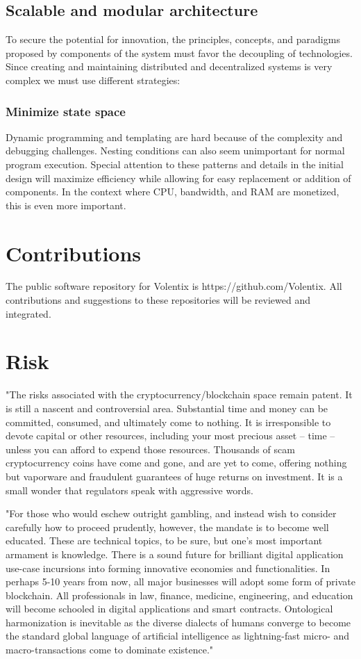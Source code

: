 \documentclass[]{article}
\begin{document}
{\subsection{Scalable and modular architecture}
To secure the potential for innovation, the principles, 
concepts, and paradigms proposed by components of the system must favor the decoupling of technologies. 
Since creating and maintaining distributed and decentralized systems
is very complex we must use different strategies: 
\subsubsection{Minimize state space}
Dynamic programming and templating are hard because of the complexity and debugging challenges. 
Nesting conditions can also seem unimportant for normal program execution.
Special attention to these patterns and details in the initial design will maximize efficiency while allowing for easy replacement or addition of components.   
In the context where CPU, bandwidth, and RAM are monetized, this is even more important. 

\section{Contributions}
The public software repository for Volentix is https://github.com/Volentix.
All contributions and suggestions to these repositories will be reviewed and integrated. 

\section{Risk}
"The risks associated with the cryptocurrency/blockchain space remain patent. It is still a nascent and controversial area. Substantial time and money can be committed, consumed, and ultimately come to nothing. It is irresponsible to devote capital or other resources, including your most precious asset -- time -- unless you can afford to expend those resources. Thousands of scam cryptocurrency coins have come and gone, and are yet to come, offering nothing but vaporware and fraudulent guarantees of huge returns on investment. It is a small wonder that regulators speak with aggressive words. 

"For those who would eschew outright gambling, and instead wish to consider carefully how to proceed prudently, however, the mandate is to become well educated. These are technical topics, to be sure, but one's most important armament is knowledge. There is a sound future for brilliant digital application use-case incursions into forming innovative economies and functionalities. In perhaps 5-10 years from now, all major businesses will adopt some form of private blockchain. All professionals in law, finance, medicine, engineering, and education will become schooled in digital applications and smart contracts. Ontological harmonization is inevitable as the diverse dialects of humans converge to become the standard global language of artificial intelligence as lightning-fast micro- and macro-transactions come to dominate existence."\cite{26}

}
\end{document}
